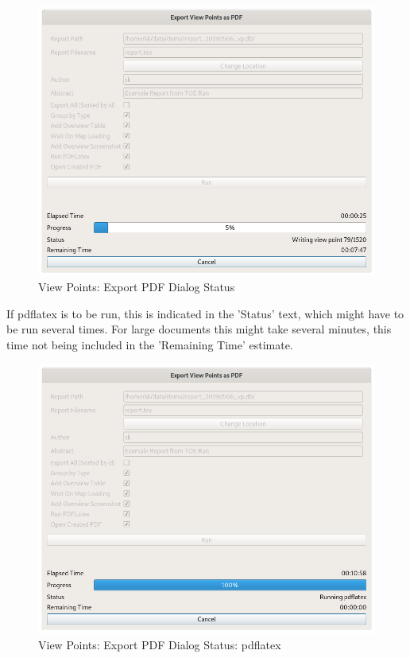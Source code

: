\begin{figure}[H]
  \centering 
    \includegraphics[width=14cm]{figures/view_points_export_pdf_status.png}
  \caption{View Points: Export PDF Dialog Status}
\end{figure}

If pdflatex is to be run, this is indicated in the 'Status' text, which might have to be run several times. For large documents this might take several minutes, this time not being included in the 'Remaining Time' estimate.

\begin{figure}[H]
  \centering 
    \includegraphics[width=14cm]{figures/view_points_export_pdf_status2.png}
  \caption{View Points: Export PDF Dialog Status: pdflatex}
\end{figure}

